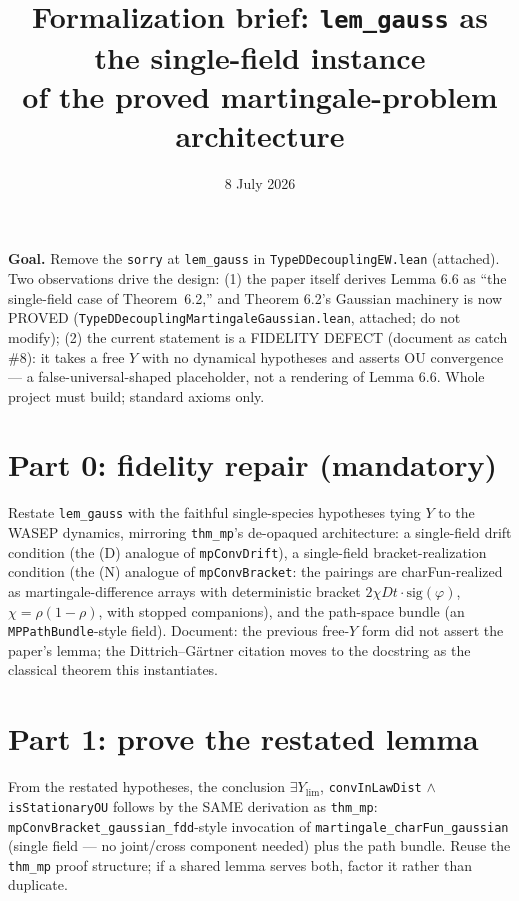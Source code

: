 \documentclass[11pt]{article}
\title{Formalization brief: \texttt{lem\_gauss} as the single-field instance\\
of the proved martingale-problem architecture}
\date{8 July 2026}
\theoremstyle{plain}
\theoremstyle{remark}
\begin{document}
\maketitle

\noindent\textbf{Goal.} Remove the \texttt{sorry} at \texttt{lem\_gauss} in
\texttt{TypeDDecouplingEW.lean} (attached). Two observations drive the design:
(1) the paper itself derives Lemma 6.6 as ``the single-field case of
Theorem~6.2,'' and Theorem 6.2's Gaussian machinery is now PROVED
(\texttt{TypeDDecouplingMartingaleGaussian.lean}, attached; do not modify);
(2) the current statement is a FIDELITY DEFECT (document as catch \#8): it
takes a free $Y$ with no dynamical hypotheses and asserts OU convergence ---
a false-universal-shaped placeholder, not a rendering of Lemma 6.6. Whole
project must build; standard axioms only.

\section*{Part 0: fidelity repair (mandatory)}

Restate \texttt{lem\_gauss} with the faithful single-species hypotheses tying
$Y$ to the WASEP dynamics, mirroring \texttt{thm\_mp}'s de-opaqued
architecture: a single-field drift condition (the (D) analogue of
\texttt{mpConvDrift}), a single-field bracket-realization condition (the (N)
analogue of \texttt{mpConvBracket}: the pairings are charFun-realized as
martingale-difference arrays with deterministic bracket
$2\chi Dt\cdot\mathrm{sig}(\varphi)$, $\chi=\rho(1-\rho)$, with stopped
companions), and the path-space bundle (an \texttt{MPPathBundle}-style field).
Document: the previous free-$Y$ form did not assert the paper's lemma; the
Dittrich--G\"artner citation moves to the docstring as the classical theorem
this instantiates.

\section*{Part 1: prove the restated lemma}

From the restated hypotheses, the conclusion
$\exists Y_{\mathrm{lim}}$, \texttt{convInLawDist} $\wedge$
\texttt{isStationaryOU} follows by the SAME derivation as \texttt{thm\_mp}:
\texttt{mpConvBracket\_gaussian\_fdd}-style invocation of
\texttt{martingale\_charFun\_gaussian} (single field --- no joint/cross
component needed) plus the path bundle. Reuse the \texttt{thm\_mp} proof
structure; if a shared lemma serves both, factor it rather than duplicate.
\end{document}
